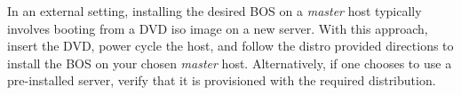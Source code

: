 In an external setting, installing the desired BOS on a {\em master} host 
typically involves booting from a DVD iso image on a new server. With this 
approach, insert the \baseOS{} DVD, power cycle the host, and follow the 
distro provided directions to install the BOS on your chosen {\em master} host. 
Alternatively, if one chooses to use a pre-installed server, verify that it is 
provisioned with the required \baseOS{} distribution.
